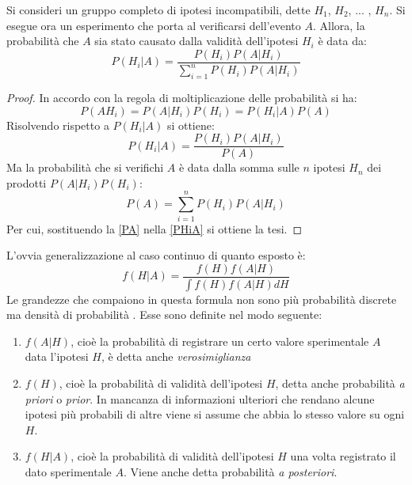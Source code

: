 \begin{teorema}
 Si consideri un gruppo completo di ipotesi incompatibili, dette $H_1$, $H_2$, $...$ , $H_n$. Si esegue ora un esperimento che porta al verificarsi dell'evento $A$.
Allora, la probabilità che $A$ sia stato causato dalla validità dell'ipotesi $H_i$ è data da:
\begin{equation}
 P(H_i|A) = \frac{P(H_i)P(A|H_i)}{\sum_{i = 1}^n P(H_i)P(A|H_i)}
\end{equation}
\end{teorema}
\begin{proof}
 In accordo con la regola di moltiplicazione delle probabilità si ha:
\begin{equation}
 P(AH_i) = P(A|H_i)P(H_i) = P(H_i|A)P(A)
\end{equation}
Risolvendo rispetto a $P(H_i|A)$ si ottiene:
\begin{equation}\label{PHiA}
P(H_i|A) = \frac{P(H_i)P(A|H_i)}{P(A)}
\end{equation}
Ma la probabilità che si verifichi $A$ è data dalla somma sulle $n$ ipotesi $H_n$ dei prodotti $P(A|H_i)P(H_i)$:
\begin{equation}\label{PA}
P(A) = \sum_{i = 1}^n P(H_i)P(A|H_i) 
\end{equation}
Per cui, sostituendo la \eqref{PA} nella \eqref{PHiA} si ottiene la tesi.
\end{proof}
L'ovvia generalizzazione al caso continuo di quanto esposto è:
\begin{equation}
 f(H|A) = \frac{f(H)f(A|H)}{\int f(H)f(A|H)dH}
\end{equation}
Le grandezze che compaiono in questa formula non sono più probabilità discrete ma densità di probabilità \cite{d'agostini}. Esse sono definite nel modo seguente:
\begin{enumerate}
 \item $f(A|H)$, cioè la probabilità di registrare un certo valore sperimentale $A$ data l'ipotesi $H$, è detta anche \emph{verosimiglianza}
 \item $f(H)$, cioè la probabilità di validità dell'ipotesi $H$, detta anche probabilità \emph{a priori} o \emph{prior}. In mancanza di informazioni ulteriori che rendano alcune 
       ipotesi più probabili di altre viene si assume che abbia lo stesso valore su ogni $H$. 
 \item $f(H|A)$, cioè la probabilità di validità dell'ipotesi $H$ una volta registrato il dato sperimentale $A$. Viene anche detta probabilità \emph{a posteriori}.
\end{enumerate}
